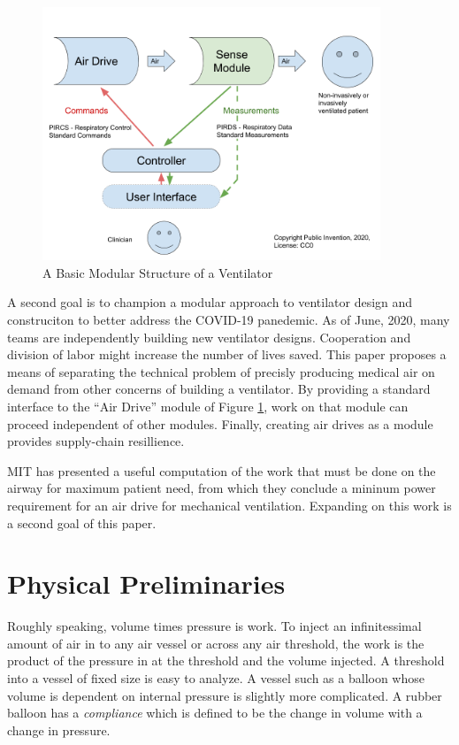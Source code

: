 \documentclass{article}
\begin{document}
\begin{figure}
\begin{center}
\includegraphics[width=0.9\textwidth]{figures/BasicModules.png}
\caption{A Basic Modular Structure of a Ventilator}
\end{center}
\label{fig:basicmodules}
\end{figure}

A second goal is to champion a modular approach to ventilator design
and construciton to better address the COVID-19 panedemic. As of June, 2020,
many teams are independently building new ventilator designs. Cooperation
and division of labor might increase the number of lives saved.
This paper proposes a means of separating the technical problem of precisly
producing medical air on demand from other concerns of building a ventilator.
By providing a standard interface to the ``Air Drive'' module of Figure \ref{fig:basicmodules},
work on that module can proceed independent of other modules.
Finally, creating air drives as a module provides supply-chain resillience.


MIT has presented a useful computation of the work that must be done
on the airway for maximum patient need, from which they conclude a
mininum power requirement for an air drive for
mechanical ventilation\cite{mitpowercalculation}. Expanding on
this work is a second goal of this paper.


\section{Physical Preliminaries}

Roughly speaking, volume times pressure is work.
To inject an infinitessimal amount of air in
to any air vessel or across any air threshold,
the work is the product of the pressure in at the threshold and the
volume injected.
A threshold into a vessel of fixed size is easy to analyze.
A vessel such as a balloon whose volume is dependent on internal pressure
is slightly more complicated.
A rubber balloon has a {\em compliance} which is defined to be
the change in volume with a change in pressure.
\end{document}
